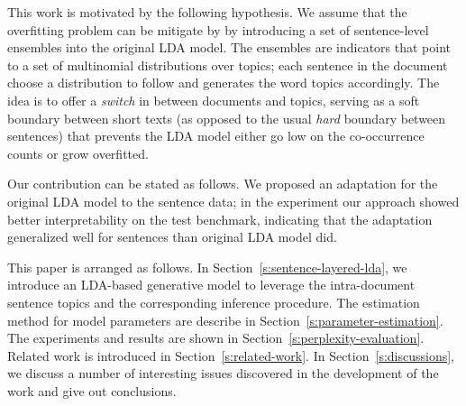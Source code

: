 This work is motivated by the following hypothesis.  We assume that the
overfitting problem can be mitigate by by introducing a set of sentence-level
ensembles into the original LDA model.  The ensembles are indicators that point
to a set of multinomial distributions over topics; each sentence in the
document choose a distribution to follow and generates the word topics
accordingly.  The idea is to offer a \emph{switch} in between documents and
topics, serving as a soft boundary between short texts (as opposed to the usual
\emph{hard} boundary between sentences) that prevents the LDA model either go
low on the co-occurrence counts or grow overfitted.  

Our contribution can be stated as follows.  We proposed an adaptation for the
original LDA model to the sentence data; in the experiment our approach showed
better interpretability on the test benchmark, indicating that the adaptation
generalized well for sentences than original LDA model did. 

This paper is arranged as follows.  In Section~\ref{s:sentence-layered-lda}, we
introduce an LDA-based generative model to leverage the intra-document sentence
topics and the corresponding inference procedure.  The estimation method for
model parameters are describe in Section~\ref{s:parameter-estimation}.  The
experiments and results are shown in Section~\ref{s:perplexity-evaluation}.  Related work
is introduced in Section~\ref{s:related-work}.  In Section~\ref{s:discussions},
we discuss a number of interesting issues discovered in the development of the
work and give out conclusions.

